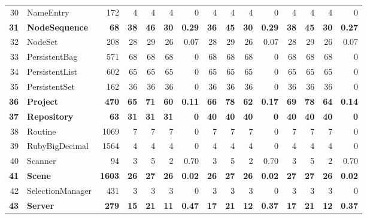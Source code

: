 \documentclass{acm_proc_article-sp}
\begin{document}
\begin{table} [htp!]
{\begin{tabularx}{1 \textwidth}{r l r r r r r r r r r r r r r}
30						& NameEntry				&172		& 4		&	4	&	4	& 	0					& 4		& 4 		& 4		& 		0			& 4			& 4			& 4			&	0	\\  
\textbf{31}						& \textbf{NodeSequence}			&\textbf{68}			& \textbf{38}		&	\textbf{46}	&	\textbf{30}	& 	\textbf{0.29}					& \textbf{36}		& \textbf{45} 		& \textbf{30}		& 		\textbf{0.29}			& \textbf{38}			& \textbf{45}			& \textbf{30}			&	\textbf{0.27}	\\     
32						& NodeSet				&208		& 28		&	29	&	26	& 	0.07					& 28		& 29 		& 26		& 		0.07			& 28			& 29			& 26			&	0.07	\\  
33						& PersistentBag			&571		& 68		&	68	&	68	& 	0					& 68		&  68		& 68		& 		0			& 68			& 68			& 68			&	0	\\         
34						& PersistentList				&602		& 65		&	65	&	65	& 	0					& 65		&  65		& 65		& 		0			& 65			& 65			& 65			&	0	\\    
35						& PersistentSet				&162		& 36		&	36	&	36	& 	0					& 36		&  36		& 36		& 		0			& 36			& 36			& 36 			&	0	\\        
\textbf{36}						& \textbf{Project}					&\textbf{470}		& \textbf{65}		&	\textbf{71}	&	\textbf{60}	& 	\textbf{0.11}					& \textbf{66}		&  \textbf{78}		& \textbf{62}		& 		\textbf{0.17}			& \textbf{69}			& \textbf{78}			& \textbf{64}			&	\textbf{0.14}	\\        
\textbf{37}						& \textbf{Repository}				&\textbf{63}			& \textbf{31}		&	\textbf{31}	&	\textbf{31}	& 	\textbf{0}					& \textbf{40}		&  \textbf{40}		& \textbf{40}		& 		\textbf{0}			& \textbf{40}			& \textbf{40}			& \textbf{40}			&	\textbf{0}	\\         
38						& Routine					&1069		& 7		&	7	&	7	& 	0					& 7		&  7		& 7		& 		0			& 7			& 7			& 7			&	0	\\
39						& RubyBigDecimal			&1564		& 4 		&	4	&	4	& 	0					& 4		& 4 		& 4		& 		0			& 4			& 4			& 4			&	0\\      
40						& Scanner				&94			& 3		&	5	&	2	& 	0.70					& 3		& 5 		& 2		& 		0.70			& 3			& 5			& 2			&	0.70\\      
\textbf{41}						& \textbf{Scene}					&\textbf{1603}		& \textbf{26}		&	\textbf{27}	&	\textbf{26}	& 	\textbf{0.02}					& \textbf{26}		& \textbf{27} 		& \textbf{26}		& 		\textbf{0.02}			& \textbf{27}			& \textbf{27}			& \textbf{26}			&	\textbf{0.02}\\      
42						& SelectionManager			&431		& 3		&	3	&	3	& 	0					& 3		& 3 		& 3		& 		0			& 3			& 3			& 3			&	0\\      
\textbf{43}						& \textbf{Server}					&\textbf{279}		&\textbf{15}		&	\textbf{21}	&	\textbf{11}	& 	\textbf{0.47}					& \textbf{17}		& \textbf{21} 		& \textbf{12}		& 		\textbf{0.37}			& \textbf{17}			& \textbf{21}			& \textbf{12}			&	\textbf{0.37}\\      

\end{tabularx}}
\end{table}
\end{document}
